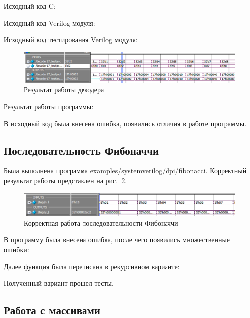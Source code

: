 \documentclass[a4paper,14pt]{article}
\begin{document}
	Исходный код C:
	{\small {}}
	
	Исходный код Verilog модуля:
	{\small {}}
	
	Исходный код тестирования Verilog модуля:
	{\small {}}
	
	\begin{figure}[H]
		\centering
		\includegraphics[width=\linewidth]{images/02_decoder}
		\caption{Результат работы декодера}
		\label{fig:02_decoder}
	\end{figure}

	Результат работы программы:
	{\small {}}

	В исходный код была внесена ошибка, появились отличия в работе программы.
	{\small {}}
	
 	\subsection{Последовательность Фибоначчи}
	
	Была выполнена программа examples/systemverilog/dpi/fibonacci.
	Корректный результат работы представлен на рис.~\ref{fig:03_fib}.
	
	\begin{figure}[H]
		\centering
		\includegraphics[width=\linewidth]{images/03_fib}
		\caption{Корректная работа последовательности Фибоначчи}
		\label{fig:03_fib}
	\end{figure}
	
	В программу была внесена ошибка, после чего появились множественные ошибки:
	{\small {}}
	
	Далее функция была переписана в рекурсивном варианте:
	{\small {}}
		
	Полученный вариант прошел тесты.
	
	\subsection{Работа с массивами}
	
\end{document}
